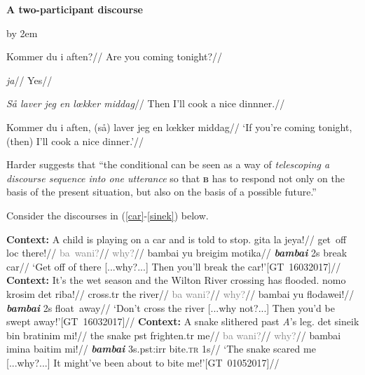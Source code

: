\documentclass[11pt]{article}
\def\beginsubsub{%
	\par
	\begingroup
	\advance\leftskip by 2em
	\def\b##1{\par\leavevmode\llap{\hbox to 2em{##1\hfil}}\ignorespaces}}
\def\endsubsub{\par\endgroup}
\begin{document}
\pex[aboveglftskip=0pt]\a\textbf{ A two-participant discourse}\beginsubsub\b{\textsc{\textbf{a.}}}\begingl\gla Kommer du i aften?//
		\glft Are you coming tonight?//\endgl
		\b{\textbf{\textsc{b.}}}\begingl\gla \textit{ja}//
		\glft Yes//\endgl
		\b{\textbf{\textsc{a.}}}\begingl\gla\textit{ Så laver jeg en lœkker middag}//
		\glft Then I'll cook a nice dinnner.//\endgl\endsubsub
\a\begingl\label{harder.cond}\gla Kommer du i aften, (så) laver jeg en lœkker middag//
	\glft `If you're coming tonight, (then) I'll cook a nice dinner.'//\endgl
\xe

Harder suggests that ``the conditional can be seen as a way of \textit{telescoping a discourse sequence into one utterance} so that \textbf{\textsc{b}} has to respond not only on the basis of the present situation, but also on the basis of a possible future.''






Consider the discourses in (\ref{car}-\ref{sinek}) below.


	\pex[everylabel=\bf\sc,aboveexskip=1pt]\textbf{Context:} A child is playing on a car and is told to stop.\label{car}
\a	\begingl 	\gla gita la jeya!//
\glb get~off {\sc loc} there!//
\endgl
\a[label=\textcolor{gray}{b}]\begingl\gla \textcolor{gray}{ba~wani?}//
\glb \textcolor{gray}{why?}//
\endgl
\a[label=\textbf{\textsc{a}}]\begingl
\gla bambai yu breigim motika//
\glb \textbf{\textit{bambai}} 2s break car//
\glft `Get off of there [...why?...] Then you'll break the car!'\hspace*{\fill}[GT~16032017]//
\endgl\xe
\pex[everylabel=\bf\sc,aboveexskip=1pt]\label{flodawei} \textbf{Context:} It's the wet season and the Wilton River crossing has flooded.
\a\begingl
\gla nomo krosim det riba!//
 cross.{\sc tr} the river//
\endgl
\a 	\begingl\gla \textcolor{gray}{ba wani?}//
\glb \textcolor{gray}{why?}//
\endgl
\a[label=\textbf{\textsc{a}}]\begingl\gla bambai yu flodawei!//
	\glb \textbf{\textit{bambai}} 2s float~away//
\glft`Don't cross the river [...why not?...] Then you'd be swept away!'\hspace*{\fill}[GT~16032017]//\endgl\xe
\pex[everylabel=\bf\sc,aboveexskip=1pt]\label{sinek}
\textbf{Context:} A snake slithered past \textit{A}'s leg.
\a\begingl
\gla det sineik bin bratinim mi!//
\glb the snake {\sc pst} frighten{\sc.tr} me//
\endgl
\a \begingl\gla \textcolor{gray}{ba wani?}//
\glb \textcolor{gray}{why?}//
\endgl
\a[label=\textbf{\textsc{a}}]\begingl\gla bambai imina baitim mi!//
\glb \textbf{\textit{bambai}} 3s{\sc.pst:irr} bite\textsc{.tr} 1s//
\glft`The snake scared me [...why?...] It might've been about to bite me!'\hspace*{\fill}[GT~01052017]//\endgl\xe
\end{document}

